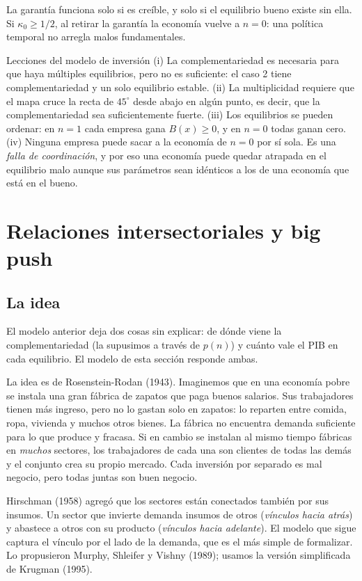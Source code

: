 \documentclass[12pt,letterpaper]{article}
\begin{document}
La garantía funciona solo si es creíble, y solo si el equilibrio bueno existe sin ella. Si $\kappa_0\geq1/2$, al retirar la garantía la economía vuelve a $n=0$: una política temporal no arregla malos fundamentales.

\begin{resultado}{Lecciones del modelo de inversión}
(i) La complementariedad es necesaria para que haya múltiples equilibrios, pero no es suficiente: el caso 2 tiene complementariedad y un solo equilibrio estable. (ii) La multiplicidad requiere que el mapa cruce la recta de $45^{\circ}$ desde abajo en algún punto, es decir, que la complementariedad sea suficientemente fuerte. (iii) Los equilibrios se pueden ordenar: en $n=1$ cada empresa gana $B(x)\geq0$, y en $n=0$ todas ganan cero. (iv) Ninguna empresa puede sacar a la economía de $n=0$ por sí sola. Es una \emph{falla de coordinación}, y por eso una economía puede quedar atrapada en el equilibrio malo aunque sus parámetros sean idénticos a los de una economía que está en el bueno.
\end{resultado}

\section{Relaciones intersectoriales y big push}\label{sec:bp}

\subsection{La idea}

El modelo anterior deja dos cosas sin explicar: de dónde viene la complementariedad (la supusimos a través de $p(n)$) y cuánto vale el PIB en cada equilibrio. El modelo de esta sección responde ambas.

La idea es de Rosenstein-Rodan (1943). Imaginemos que en una economía pobre se instala una gran fábrica de zapatos que paga buenos salarios. Sus trabajadores tienen más ingreso, pero no lo gastan solo en zapatos: lo reparten entre comida, ropa, vivienda y muchos otros bienes. La fábrica no encuentra demanda suficiente para lo que produce y fracasa. Si en cambio se instalan al mismo tiempo fábricas en \emph{muchos} sectores, los trabajadores de cada una son clientes de todas las demás y el conjunto crea su propio mercado. Cada inversión por separado es mal negocio, pero todas juntas son buen negocio.

Hirschman (1958) agregó que los sectores están conectados también por sus insumos. Un sector que invierte demanda insumos de otros (\emph{vínculos hacia atrás}) y abastece a otros con su producto (\emph{vínculos hacia adelante}). El modelo que sigue captura el vínculo por el lado de la demanda, que es el más simple de formalizar. Lo propusieron Murphy, Shleifer y Vishny (1989); usamos la versión simplificada de Krugman (1995).
\end{document}
